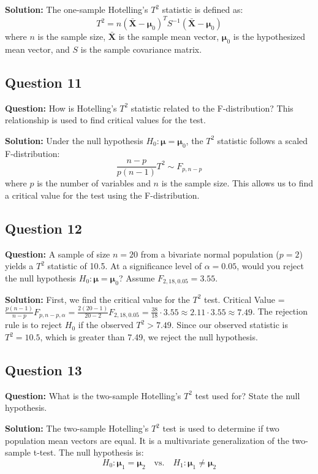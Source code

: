 \textbf{Solution:}
The one-sample Hotelling's $T^2$ statistic is defined as:
$$ T^2 = n(\bar{\mathbf{X}} - \boldsymbol{\mu}_0)^T S^{-1} (\bar{\mathbf{X}} - \boldsymbol{\mu}_0) $$
where $n$ is the sample size, $\bar{\mathbf{X}}$ is the sample mean vector, $\boldsymbol{\mu}_0$ is the hypothesized mean vector, and $S$ is the sample covariance matrix.

\subsection*{Question 11}
\textbf{Question:} How is Hotelling's $T^2$ statistic related to the F-distribution? This relationship is used to find critical values for the test.

\textbf{Solution:}
Under the null hypothesis $H_0: \boldsymbol{\mu} = \boldsymbol{\mu}_0$, the $T^2$ statistic follows a scaled F-distribution:
$$ \frac{n-p}{p(n-1)} T^2 \sim F_{p, n-p} $$
where $p$ is the number of variables and $n$ is the sample size. This allows us to find a critical value for the test using the F-distribution.

\subsection*{Question 12}
\textbf{Question:} A sample of size $n=20$ from a bivariate normal population ($p=2$) yields a $T^2$ statistic of 10.5. At a significance level of $\alpha=0.05$, would you reject the null hypothesis $H_0: \boldsymbol{\mu} = \boldsymbol{\mu}_0$? Assume $F_{2, 18, 0.05} = 3.55$.

\textbf{Solution:}
First, we find the critical value for the $T^2$ test.
Critical Value = $\frac{p(n-1)}{n-p}F_{p, n-p, \alpha} = \frac{2(20-1)}{20-2}F_{2, 18, 0.05} = \frac{38}{18} \cdot 3.55 \approx 2.11 \cdot 3.55 \approx 7.49$.
The rejection rule is to reject $H_0$ if the observed $T^2 > 7.49$.
Since our observed statistic is $T^2 = 10.5$, which is greater than 7.49, we reject the null hypothesis.

\subsection*{Question 13}
\textbf{Question:} What is the two-sample Hotelling's $T^2$ test used for? State the null hypothesis.

\textbf{Solution:}
The two-sample Hotelling's $T^2$ test is used to determine if two population mean vectors are equal. It is a multivariate generalization of the two-sample t-test.
The null hypothesis is:
$$ H_0: \boldsymbol{\mu}_1 = \boldsymbol{\mu}_2 \quad \text{vs.} \quad H_1: \boldsymbol{\mu}_1 \neq \boldsymbol{\mu}_2 $$

